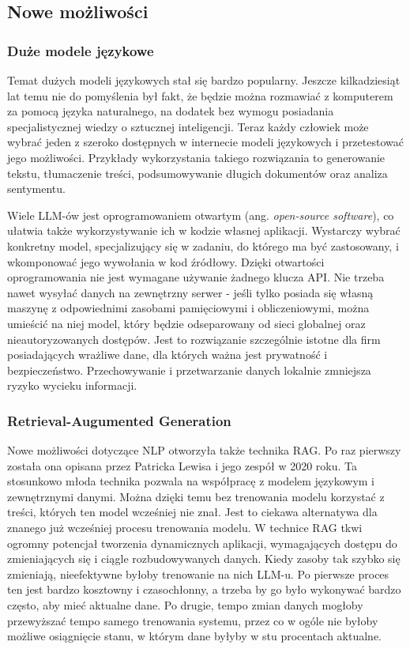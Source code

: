 \subsection{Nowe możliwości}

\subsubsection{Duże modele językowe}

Temat dużych modeli językowych stał się bardzo popularny. Jeszcze kilkadziesiąt lat temu nie do pomyślenia był fakt, że będzie można rozmawiać z komputerem za pomocą języka naturalnego, na dodatek bez wymogu posiadania specjalistycznej wiedzy o sztucznej inteligencji. Teraz każdy człowiek może wybrać jeden z szeroko dostępnych w internecie modeli językowych i przetestować jego możliwości. Przykłady wykorzystania takiego rozwiązania to generowanie tekstu, tłumaczenie treści, podsumowywanie długich dokumentów oraz analiza sentymentu.

Wiele LLM-ów jest oprogramowaniem otwartym (ang. \textit{open-source software}), co ułatwia także wykorzystywanie ich w kodzie własnej aplikacji. Wystarczy wybrać konkretny model, specjalizujący się w zadaniu, do którego ma być zastosowany, i wkomponować jego wywołania w kod źródłowy. Dzięki otwartości oprogramowania nie jest wymagane używanie żadnego klucza API. Nie trzeba nawet wysyłać danych na zewnętrzny serwer - jeśli tylko posiada się własną maszynę z odpowiednimi zasobami pamięciowymi i obliczeniowymi, można umieścić na niej model, który będzie odseparowany od sieci globalnej oraz nieautoryzowanych dostępów. Jest to rozwiązanie szczególnie istotne dla firm posiadających wrażliwe dane, dla których ważna jest prywatność i bezpieczeństwo. Przechowywanie i przetwarzanie danych lokalnie zmniejsza ryzyko wycieku informacji.

\subsubsection{Retrieval-Augumented Generation}

Nowe możliwości dotyczące NLP otworzyła także technika RAG. Po raz pierwszy została ona opisana przez Patricka Lewisa i jego zespół w 2020 roku\cite{lewis2021retrievalaugmentedgeneration}. Ta stosunkowo młoda technika pozwala na współpracę z modelem językowym i zewnętrznymi danymi. Można dzięki temu bez trenowania modelu korzystać z treści, których ten model wcześniej nie znał. Jest to ciekawa alternatywa dla znanego już wcześniej procesu trenowania modelu. W technice RAG tkwi ogromny potencjał tworzenia dynamicznych aplikacji, wymagających dostępu do zmieniających się i ciągle rozbudowywanych danych. Kiedy zasoby tak szybko się zmieniają, nieefektywne byłoby trenowanie na nich LLM-u. Po pierwsze proces ten jest bardzo kosztowny i czasochłonny, a trzeba by go było wykonywać bardzo często, aby mieć aktualne dane. Po drugie, tempo zmian danych mogłoby przewyższać tempo samego trenowania systemu, przez co w ogóle nie byłoby możliwe osiągnięcie stanu, w którym dane byłyby w stu procentach aktualne.

